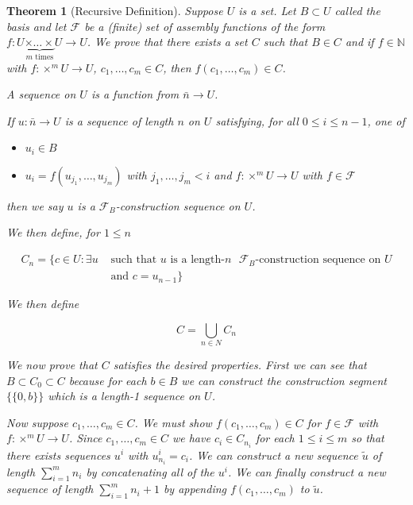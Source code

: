 \documentclass[12pt]{article}
\theoremstyle{break}
\theoremstyle{break}
\newtheorem{theorem}{Theorem}[section]
\theoremstyle{break}
\theoremstyle{break}
\theoremstyle{break}
\newtheorem{informal definition}[definition]{Informal Definition}
\newcommand{\mc}[1]{\mathcal{#1}}
\begin{document}
\begin{theorem}[Recursive Definition]
Suppose $U$ is a set.
Let $B\subset U$ called the basis and let $\mc{F}$ be a (finite) set of assembly functions of the form $f: U \underbrace{\times \ldots \times}_{m \text{ times}} U \to U$.
We prove that there exists a set $C$ such that $B\in C$ and if $f\in \mathbb{N}$ with $f: \times^m U \to U$, $c_1,\ldots, c_m\in C$, then $f(c_1, \ldots, c_m) \in C$.

A sequence on $U$ is a function from $\bar{n} \to U$.

If $u: \bar{n} \to U$ is a sequence of length $n$ on $U$ satisfying, for all $0 \le i \le n-1$, one of
\begin{itemize}
\item{$u_i \in B$}
\item{$u_i = f(u_{j_1}, \ldots, u_{j_m})$ with $j_1,\ldots,j_m < i$ and $f:\times^m U \to U$ with $f\in \mc{F}$}
\end{itemize}
then we say $u$ is a $\mc{F}_B$-construction sequence on $U$.

We then define, for $1\le n$

\begin{equation*}
\begin{split}
C_n = \{c\in U: \exists u &\text{ such that } u \text{ is a length-$n$ } \mc{F}_B \text{-construction sequence on } U \\ & \text{ and } c = u_{n-1}\}
\end{split}
\end{equation*}

We then define

$$
C = \bigcup_{n\in N} C_n
$$

We now prove that $C$ satisfies the desired properties.
First we can see that $B \subset C_0 \subset C$ because for each $b\in B$ we can construct the construction segment $\{\{0, b\}\}$ which is a length-1 sequence on $U$.

Now suppose $c_1, \ldots, c_m \in C$.
We must show $f(c_1,\ldots, c_m)\in C$ for $f\in \mc{F}$ with $f:\times^m U \to U$.
Since $c_1, \ldots, c_m \in C$ we have $c_i \in C_{n_i}$ for each $1\le i \le m$ so that there exists sequences $u^i$ with $u^i_{n_i} = c_i$.
We can construct a new sequence $\tilde{u}$ of length $\sum_{i=1}^m n_i$ by concatenating all of the $u^i$.
We can finally construct a new sequence of length $\sum_{i=1}^m n_i + 1$ by appending $f(c_1,\ldots, c_m)$ to $\tilde{u}$.

\end{theorem}
\end{document}
